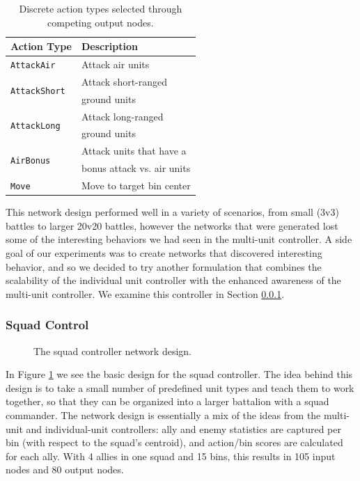 \documentclass[10pt,a4paper,twocolumn]{article}
\begin{document}
\begin{table}
\centering
\begin{tabular}{|l|l|}
	\hline
	{\bf Action Type} & {\bf Description}\\ \hline
	\texttt{AttackAir} & Attack air units\\ \hline
	\multirow{2}{*}{\texttt{AttackShort}} & Attack short-ranged \\
	& ground units\\ \hline
	\multirow{2}{*}{\texttt{AttackLong}} & Attack long-ranged \\ 
	& ground units\\ \hline
	\multirow{2}{*}{\texttt{AirBonus}} & Attack units that have a \\
	& bonus attack vs. air units\\ \hline
	\texttt{Move} & Move to target bin center\\ \hline
\end{tabular}
\caption{Discrete action types selected through competing output nodes.}
\label{tab:actions}
\end{table}

This network design performed well in a variety of scenarios, from small (3v3) battles to larger 20v20 battles, however the networks that were generated lost some of the interesting behaviors we had seen in the multi-unit controller. A side goal of our experiments was to create networks that discovered interesting behavior, and so we decided to try another formulation that combines the scalability of the individual unit controller with the enhanced awareness of the multi-unit controller. We examine this controller in Section \ref{sec:squad_design}.

\subsubsection{Squad Control}
\label{sec:squad_design}

\begin{figure}

\caption{The squad controller network design.}
\label{fig:squad_design}
\end{figure}

In Figure \ref{fig:squad_design} we see the basic design for the squad controller. The idea behind this design is to take a small number of predefined unit types and teach them to work together, so that they can be organized into a larger battalion with a squad commander. The network design is essentially a mix of the ideas from the multi-unit and individual-unit controllers: ally and enemy statistics are captured per bin (with respect to the squad's centroid), and action/bin scores are calculated for each ally. With 4 allies in one squad and 15 bins, this results in 105 input nodes and 80 output nodes.
\end{document}
